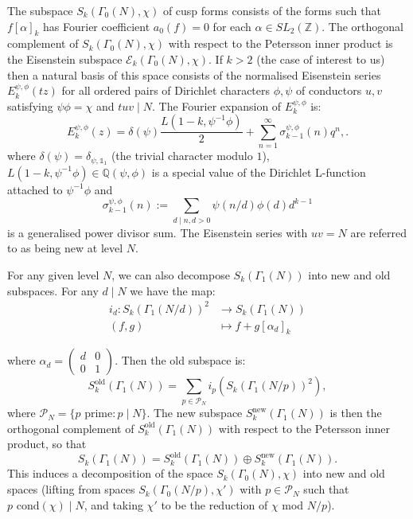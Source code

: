 \documentclass{amsart}
\theoremstyle{plain}
\theoremstyle{definition}
\newcommand*{\field}[1]{\mathbb{#1}}
\begin{document}
The subspace $S_k(\Gamma_0(N), \chi)$ of cusp forms consists of the forms such that $f[\alpha]_k$ has Fourier coefficient $a_0(f)=0$ for each $\alpha\in SL_2(\field{Z})$. The orthogonal complement of $S_k(\Gamma_0(N),\chi)$ with respect to the Petersson inner product is the Eisenstein subspace $\mathcal{E}_k(\Gamma_0(N), \chi)$. If $k>2$ (the case of interest to us) then a natural basis of this space consists of the normalised Eisenstein series $E_k^{\psi, \phi}(tz)$ for all ordered pairs of Dirichlet characters $\phi,\psi$ of conductors $u,v$ satisfying $\psi\phi = \chi$ and $tuv\mid N$. The Fourier expansion of $ E_k^{\psi,\phi}$ is:
\begin{equation*}
    E_k^{\psi,\phi}(z)=\delta(\psi)\frac{L(1-k, \psi^{-1}\phi)}{2} + \sum_{n=1}^\infty \sigma_{k-1}^{\psi, \phi}(n) q^n,.
\end{equation*}
where $\delta(\psi)=\delta_{\psi,\mathds{1}_1}$ (the trivial character modulo $1$), $L(1-k,\psi^{-1}\phi)\in\mathbb{Q}(\psi,\phi)$ is a special value of the Dirichlet L-function attached to $\psi^{-1}\phi$ and
\begin{equation*}
   \sigma_{k-1}^{\psi,\phi}(n):=\sum_{d\mid n, d>0} \psi(n/d) \phi(d) d^{k-1}
\end{equation*}
is a generalised power divisor sum. The Eisenstein series with $uv = N$ are referred to as being new at level $N$. 

For any given level $N$, we can also decompose $S_k(\Gamma_1(N))$ into new and old subspaces. For any $d\mid N$ we have the map:
\begin{align*}
    i_d: S_k(\Gamma_1(N/d))^2 &\rightarrow S_k(\Gamma_1(N)) \\
    (f,g) &\mapsto f + g[\alpha_d]_k
\end{align*}

\noindent where $\alpha_d = \left(\begin{smallmatrix} d & 0 \\ 0 & 1\end{smallmatrix}\right)$. Then the old subspace is:
\begin{equation*}
 S_k^{\text{old}}(\Gamma_1(N)) = \sum_{p \in \mathcal{P}_N} i_p(S_k(\Gamma_1(N/p))^2),
\end{equation*} where $\mathcal{P}_N=\{p \text{ prime}: p \mid N \}$. The new subspace $S_k^{\text{new}}(\Gamma_1(N))$ is then the orthogonal complement of $S_k^{\text{old}}(\Gamma_1(N))$ with respect to the Petersson inner product, so that 
\begin{equation*}
   S_k(\Gamma_1(N)) = S_k^{\text{old}}(\Gamma_1(N))\oplus S_k^{\text{new}}(\Gamma_1(N)). 
\end{equation*} This induces a decomposition of the space $S_k(\Gamma_0(N),\chi)$ into new and old spaces (lifting from spaces $S_k(\Gamma_0(N/p),\chi')$ with $p\in \mathcal{P}_N$ such that $p\text{ cond}(\chi)\mid N$, and taking $\chi'$ to be the reduction of $\chi$ mod $N/p$).
\end{document}
